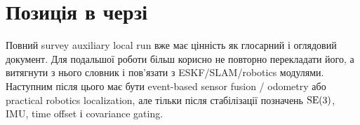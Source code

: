 \section{Позиція в черзі}

Повний survey auxiliary local run вже має цінність як глосарний і оглядовий документ. Для подальшої роботи більш корисно не повторно перекладати його, а витягнути з нього словник і пов'язати з ESKF/SLAM/robotics модулями. Наступним після цього має бути event-based sensor fusion / odometry або practical robotics localization, але тільки після стабілізації позначень $\mathrm{SE}(3)$, IMU, time offset і covariance gating.
